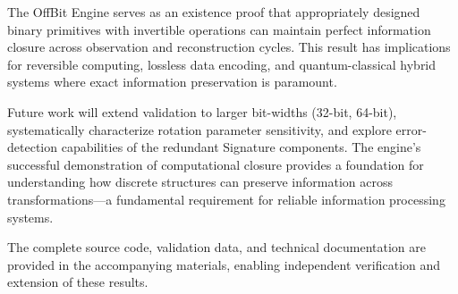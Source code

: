 \documentclass[11pt,letterpaper]{article}
\begin{document}
The OffBit Engine serves as an existence proof that appropriately designed binary primitives with invertible operations can maintain perfect information closure across observation and reconstruction cycles. This result has implications for reversible computing, lossless data encoding, and quantum-classical hybrid systems where exact information preservation is paramount.

Future work will extend validation to larger bit-widths (32-bit, 64-bit), systematically characterize rotation parameter sensitivity, and explore error-detection capabilities of the redundant Signature components. The engine's successful demonstration of computational closure provides a foundation for understanding how discrete structures can preserve information across transformations—a fundamental requirement for reliable information processing systems.

The complete source code, validation data, and technical documentation are provided in the accompanying materials, enabling independent verification and extension of these results.



\end{document}
